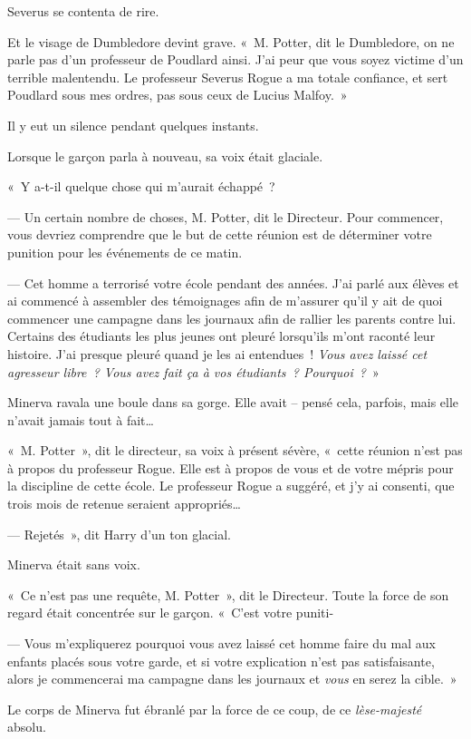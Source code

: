 Severus se contenta de rire.

Et le visage de Dumbledore devint grave. «~M. Potter, dit le Dumbledore, on ne parle pas d'un professeur de Poudlard ainsi. J'ai peur que vous soyez victime d'un terrible malentendu. Le professeur Severus Rogue a ma totale confiance, et sert Poudlard sous mes ordres, pas sous ceux de Lucius Malfoy.~»

Il y eut un silence pendant quelques instants.

Lorsque le garçon parla à nouveau, sa voix était glaciale.

«~Y a-t-il quelque chose qui m'aurait échappé~?

--- Un certain nombre de choses, M. Potter, dit le Directeur. Pour commencer, vous devriez comprendre que le but de cette réunion est de déterminer votre punition pour les événements de ce matin.

--- Cet homme a terrorisé votre école pendant des années. J'ai parlé aux élèves et ai commencé à assembler des témoignages afin de m'assurer qu'il y ait de quoi commencer une campagne dans les journaux afin de rallier les parents contre lui. Certains des étudiants les plus jeunes ont pleuré lorsqu'ils m'ont raconté leur histoire. J'ai presque pleuré quand je les ai entendues~! \emph{Vous avez laissé cet agresseur libre~? Vous avez fait ça à vos étudiants~? Pourquoi~?}~»

Minerva ravala une boule dans sa gorge. Elle avait -- pensé cela, parfois, mais elle n'avait jamais tout à fait…

«~M. Potter~», dit le directeur, sa voix à présent sévère, «~cette réunion n'est pas à propos du professeur Rogue. Elle est à propos de vous et de votre mépris pour la discipline de cette école. Le professeur Rogue a suggéré, et j'y ai consenti, que trois mois de retenue seraient appropriés…

--- Rejetés~», dit Harry d'un ton glacial.

Minerva était sans voix.

«~Ce n'est pas une requête, M. Potter~», dit le Directeur. Toute la force de son regard était concentrée sur le garçon. «~C'est votre puniti-

--- Vous m'expliquerez pourquoi vous avez laissé cet homme faire du mal aux enfants placés sous votre garde, et si votre explication n'est pas satisfaisante, alors je commencerai ma campagne dans les journaux et \emph{vous} en serez la cible.~»

Le corps de Minerva fut ébranlé par la force de ce coup, de ce \emph{lèse-majesté} absolu.

